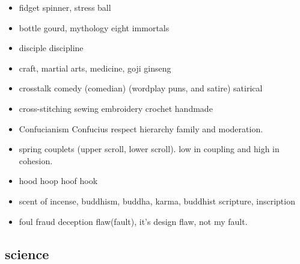 \documentclass[a4paper,11pt,twoside]{book}
\begin{document}
\begin{itemize}
	\item fidget spinner, stress ball
	
	\item bottle gourd, mythology eight immortals 
	
	\item disciple discipline
	
	\item craft, martial arts, medicine, goji ginseng
	
	\item crosstalk comedy (comedian) (wordplay puns, and satire) satirical 
	
	\item cross-stitching sewing embroidery crochet handmade
	
	\item Confucianism Confucius respect hierarchy family and moderation.
	
	\item spring couplets (upper scroll, lower scroll). low in coupling and high in cohesion.
	
	\item hood hoop hoof hook
	
	\item scent of incense, buddhism, buddha, karma, buddhist scripture, inscription
	
	\item foul fraud deception flaw(fault), it's design flaw, not my fault.
	
\end{itemize}

\subsection{science}
\end{document}
